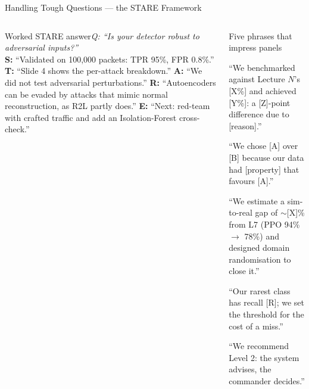 \documentclass[aspectratio=169,10pt,t]{beamer}
\begin{document}
\begin{frame}{Handling Tough Questions --- the STARE Framework}
\begin{columns}[T]
\begin{cbox}[ISSAgrn]{Worked STARE answer}\scriptsize\textit{Q: ``Is your detector robust to adversarial inputs?''}\\ \textbf{S:} ``Validated on 100,000 packets: TPR 95\%, FPR 0.8\%.'' \textbf{T:} ``Slide 4 shows the per-attack breakdown.'' \textbf{A:} ``We did not test adversarial perturbations.'' \textbf{R:} ``Autoencoders can be evaded by attacks that mimic normal reconstruction, as R2L partly does.'' \textbf{E:} ``Next: red-team with crafted traffic and add an Isolation-Forest cross-check.''\end{cbox}
\begin{cbox}[AccentCol]{Five phrases that impress panels}\scriptsize\begin{te}\item ``We benchmarked against Lecture $N$'s [X\%] and achieved [Y\%]: a [Z]-point difference due to [reason].''\item ``We chose [A] over [B] because our data had [property] that favours [A].''\item ``We estimate a sim-to-real gap of $\sim$[X]\% from L7 (PPO 94\% $\to$ 78\%) and designed domain randomisation to close it.''\item ``Our rarest class has recall [R]; we set the threshold for the cost of a miss.''\item ``We recommend Level 2: the system advises, the commander decides.''\end{te}\end{cbox}
\end{columns}
\end{frame}
\end{document}
